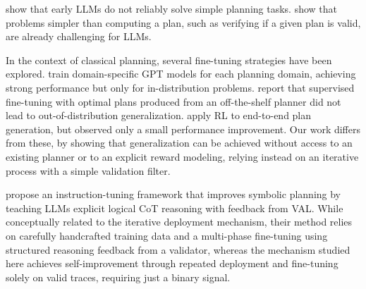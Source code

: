 \citet{valmeekam-et-al-neurips2023} show that early LLMs do not reliably solve
simple planning tasks. \citet{kokel-et-al-aaai2025} show that problems simpler
than computing a plan, such as verifying if a given plan is valid, are already
challenging for LLMs.

In the context of classical planning, several fine-tuning strategies have been
explored. \citet{rossetti-et-al-icaps2024} train domain-specific GPT models for
each planning domain, achieving strong performance but only for in-distribution
problems. \citet{bohnet-et-al-arxiv2024} report that supervised fine-tuning with
optimal plans produced from an off-the-shelf planner \citep{helmert-jair2006}
did not lead to out-of-distribution
generalization. \citet{huang-et-al-icaps2025} apply RL to end-to-end plan
generation, but observed only a small performance improvement. Our work differs
from these, by showing that generalization can be achieved without access to an
existing planner or to an explicit reward modeling, relying instead on an
iterative process with a simple validation filter.

\citet{verma-et-al-arxiv2025} propose an instruction-tuning framework that
improves symbolic planning by teaching LLMs explicit logical CoT reasoning with
feedback from VAL. While conceptually related to the iterative deployment
mechanism, their method relies on carefully handcrafted training data and a
multi-phase fine-tuning using structured reasoning feedback from a validator,
whereas the mechanism studied here achieves self-improvement through repeated
deployment and fine-tuning solely on valid traces, requiring just a binary
signal.
